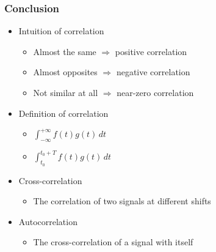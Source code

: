 \documentclass{beamer}
\begin{document}
\begin{frame}
  \frametitle{Conclusion}

  \begin{itemize}
    \item<2-> Intuition of correlation
    
      \begin{itemize}
        \item Almost the same $\Rightarrow$ positive correlation
        
        \item Almost opposites $\Rightarrow$ negative correlation
        
        \item Not similar at all $\Rightarrow$ near-zero correlation
      \end{itemize}
        
    \item<3-> Definition of correlation
    
      \begin{itemize}
        \item $\int_{-\infty}^{+\infty} f(t) g(t) \,dt$
        
        \item $\int_{t_0}^{t_0 + T} f(t) g(t) \,dt$
      \end{itemize}
    
    \item<4-> Cross-correlation
    
      \begin{itemize}
        \item The correlation of two signals at different shifts
      \end{itemize}
    
    \item<5-> Autocorrelation
    
      \begin{itemize}
        \item The cross-correlation of a signal with itself
      \end{itemize}
  \end{itemize}
\end{frame}
\end{document}
